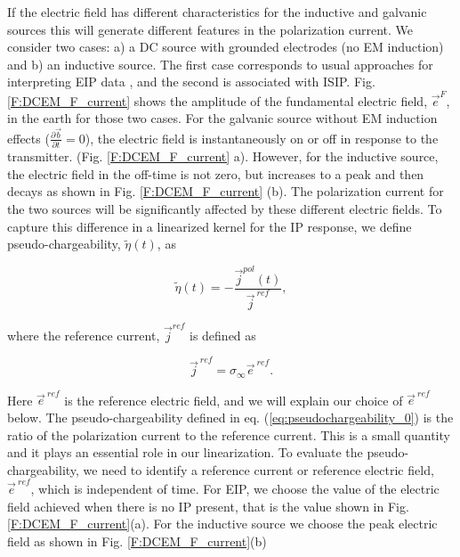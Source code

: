 \documentclass[extra,mreferee]{gji}
\newcommand{\siginf}{\sigma_\infty}
\renewcommand {\j}  { {\vec j} }
\renewcommand {\b}  { {\vec b} }
\newcommand {\e}  { {\vec e} }
\newcommand{\peta}{\tilde{\eta}}
\newcommand{\eref}{\e^{\ ref}}
\begin{document}
If the electric field has different characteristics for the inductive and galvanic sources this will generate different features in the polarization current.
We consider two cases: a) a DC source with grounded electrodes (no EM induction) and b) an inductive source. The first case corresponds to usual approaches for interpreting EIP data \cite[]{seigel1959, doug1994}, and the second is associated with ISIP.
Fig. \ref{F:DCEM_F_current} shows the amplitude of the fundamental electric field, $\e^{F}$, in the earth for those two cases.
For the galvanic source without EM induction effects ($\frac{\partial \b}{\partial t}=0$), the electric field is instantaneously on or off in response to the transmitter. (Fig. \ref{F:DCEM_F_current} a).
However, for the inductive source, the electric field in the off-time is not zero, but increases to a peak and then decays as shown in Fig. \ref{F:DCEM_F_current} (b).
The polarization current for the two sources will be significantly affected by these different electric fields.
To capture this difference in a linearized kernel for the IP response, we define pseudo-chargeability, $\peta(t)$, as
\begin{linenomath*}
\begin{equation}
  \peta(t) = -\frac{\j^{pol}(t)}{\j^{\ ref}},
  \label{eq:pseudochargeability_0}
\end{equation}
\end{linenomath*}
where the reference current, $\j^{ref}$ is defined as
\begin{linenomath*}
\begin{equation}
  \j^{\ ref} = \siginf \eref.
  \label{eq:reference_current}
\end{equation}
\end{linenomath*}
Here $\eref$ is the reference electric field, and we will explain our choice of $\eref$ below.
The pseudo-chargeability defined in eq. (\ref{eq:pseudochargeability_0}) is the ratio of  the polarization current to the reference current. This is a small quantity and it plays an essential role in our linearization.
To evaluate the pseudo-chargeability, we need to identify a reference current or reference electric field, $\eref$, which is independent of time. For EIP, we choose the value of the electric field achieved when there is no IP present, that is the value shown  in Fig. \ref{F:DCEM_F_current}(a). For the inductive source  we choose the peak electric field as shown in Fig. \ref{F:DCEM_F_current}(b)
\end{document}
